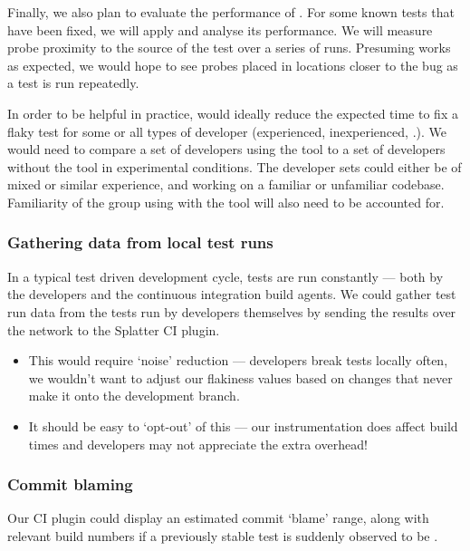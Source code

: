Finally, we also plan to evaluate the performance of \splatter{}. For some known \flaky{} tests that have been fixed, we will apply \splatter{} and analyse its performance. We will measure probe proximity to the source of the \flaky{} test over a series of runs. Presuming \splatter{} works as expected, we would hope to see probes placed in locations closer to the bug as a test is run repeatedly.

In order to be helpful in practice, \splatter{} would ideally reduce the expected time to fix a flaky test for some or all types of developer (experienced, inexperienced, \etc.). We would need to compare a set of developers using the tool to a set of developers without the tool in experimental conditions. The developer sets could either be of mixed or similar experience, and working on a familiar or unfamiliar codebase. Familiarity of the group using \splatter{} with the tool will also need to be accounted for.

\subsubsection{Gathering data from local test runs}

In a typical test driven development cycle, tests are run constantly --- both by the developers and the continuous integration build agents. We could gather test run data from the tests run by developers themselves by sending the results over the network to the Splatter CI plugin.

\begin{itemize}
	\item This would require {\lq}noise{\rq} reduction --- developers break tests locally often, we wouldn't want to adjust our flakiness values based on changes that never make it onto the development branch.
	\item It should be easy to {\lq}opt-out{\rq} of this --- our instrumentation does affect build times and developers may not appreciate the extra overhead!
\end{itemize}

\subsubsection{Commit blaming}

Our CI plugin could display an estimated commit {\lq}blame{\rq} range, along with relevant build numbers if a previously stable test is suddenly observed to be \flaky{}.

